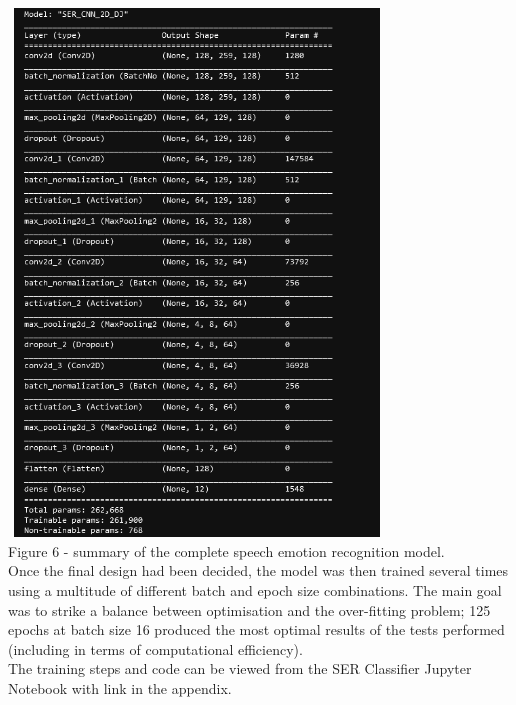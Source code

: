 \documentclass[12pt]{article}
\begin{document}
\includegraphics[width=10cm,height=14cm]{figure_6_model_visualisation}
\\

Figure 6 - summary of the complete speech emotion recognition model.
\\

\noindent Once the final design had been decided, the model was then trained several times using a multitude of different batch and epoch size combinations. The main goal was to strike a balance between optimisation and the over-fitting problem; 125 epochs at batch size 16 produced the most optimal results of the tests performed (including in terms of computational efficiency).
\\

\noindent The training steps and code can be viewed from the SER Classifier Jupyter Notebook with link in the appendix.
\end{document}
